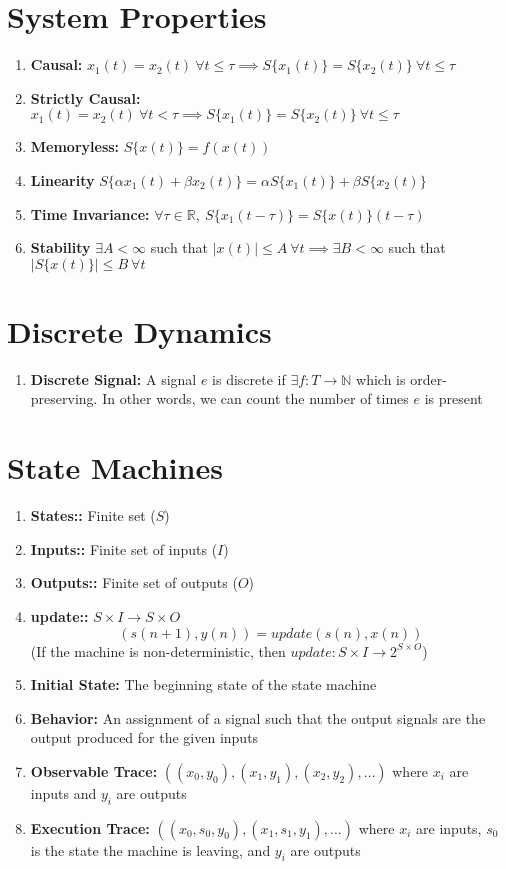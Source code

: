 \documentclass{article}
\newcommand{\defn}[1]{\textbf{#1:}}
\begin{document}
\section*{System Properties}
\noindent\makebox[\linewidth]{\rule{\textwidth}{0.4pt}}
\begin{enumerate}
  \item[]\textbf{Causal:} $x_1(t) = x_2(t) \ \forall t \leq \tau \implies S\{x_1(t)\} = S\{x_2(t)\} \ \forall t \leq \tau$ 
  \item[]\textbf{Strictly Causal:} $x_1(t) = x_2(t) \ \forall t < \tau \implies S\{x_1(t)\} = S\{x_2(t)\} \ \forall t \leq \tau$ 
  \item[]\textbf{Memoryless:} $S\{x(t)\} = f(x(t))$
  \item[]\textbf{Linearity} $S\{\alpha x_1(t) + \beta x_2(t)\} = \alpha S\{x_1(t)\} + \beta S\{x_2(t)\}$
  \item[]\textbf{Time Invariance:} $\forall \tau \in \mathbb{R},\ S\{x_1(t-\tau)\} = S\{x(t)\}(t-\tau)$
  \item[]\textbf{Stability} $\exists A < \infty$ such that $|x(t)|\leq A \ \forall t \implies \exists B < \infty$ such that $|S\{x(t)\}|\leq B \ \forall t$
\end{enumerate}
\section*{Discrete Dynamics}
\noindent\makebox[\linewidth]{\rule{\textwidth}{0.4pt}}
\begin{enumerate}
  \item[] \textbf{Discrete Signal:} A signal $e$ is discrete if $\exists f:T\to \mathbb{N}$ which is order-preserving. In other words, we can count the number of times $e$ is present
\end{enumerate}
\section*{State Machines}
\noindent\makebox[\linewidth]{\rule{\textwidth}{0.4pt}}
\begin{enumerate}
  \item [] \defn{States:} Finite set ($S$)
  \item [] \defn{Inputs:} Finite set of inputs ($I$)
  \item [] \defn{Outputs:} Finite set of outputs ($O$)
  \item [] \defn{update:} $S \times I \to S \times O$
    $$(s(n+1), y(n)) = update(s(n), x(n))$$
    (If the machine is non-deterministic, then $update: S \times I \to 2^{S \times O}$)
  \item [] \defn{Initial State} The beginning state of the state machine
  \item [] \defn{Behavior} An assignment of a signal such that the output signals are the output produced for the given inputs
  \item [] \defn{Observable Trace} $((x_0, y_0), (x_1, y_1), (x_2, y_2),\dots)$ where $x_i$ are inputs and $y_i$ are outputs
  \item [] \defn{Execution Trace} $((x_0, s_0, y_0), (x_1, s_1, y_1),\dots)$ where $x_i$ are inputs, $s_0$ is the state the machine is leaving, and $y_i$ are outputs
\end{enumerate}
\end{document}
